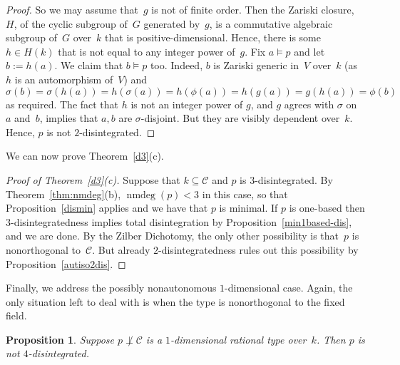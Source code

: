 \documentclass[\DocOpts]{amsart}
\newtheorem{proposition}[theorem]{Proposition}
\theoremstyle{definition}
\def\nmdeg{\operatorname{nmdeg}}
\def\C{\mathcal{C}}
\newcommand{\<}{\langle}
\renewcommand{\>}{\rangle}
\begin{document}
\begin{proof}
So we may assume that~$g$ is not of finite order.
Then the Zariski closure, $H$, of the cyclic subgroup of~$G$ generated by~$g$, is a commutative algebraic subgroup of~$G$ over~$k$ that is positive-dimensional.
Hence, there is some $h\in H(k)$ that is not equal to any integer power of~$g$.
Fix $a\models p$ and let $b:=h(a)$.
We claim that $b\models p$ too.
Indeed, $b$ is Zariski generic in~$V$ over~$k$ (as $h$ is an automorphism of~$V$) and
$$\sigma(b)=\sigma(h(a))=h(\sigma(a))=h(\phi(a))=h(g(a))=g(h(a))=\phi(b)
$$
as required.
The fact that $h$ is not an integer power of $g$, and $g$ agrees with $\sigma$ on~$a$ and~$b$, implies that $a, b$ are $\sigma$-disjoint.
But they are visibly dependent over~$k$.
Hence, $p$ is not $2$-disintegrated.
\end{proof}

We can now prove Theorem~\ref{d3}(c).

\begin{proof}[Proof of Theorem~\ref{d3}(c)]
Suppose that $k\subseteq\C$ and $p$ is $3$-disintegrated.
By Theorem~\ref{thm:nmdeg}(b), $\nmdeg(p)< 3$ in this case, so that Proposition~\ref{dismin} applies and we have that $p$ is minimal.
If $p$ is one-based then $3$-disintegratedness implies total disintegration by Proposition~\ref{min1based-dis}, and we are done.
By the Zilber Dichotomy, the only other possibility is that~$p$ is nonorthogonal to~$\C$.
But already $2$-disintegratedness rules out this possibility by Proposition~\ref{autiso2dis}.
\end{proof}

Finally, we address the possibly nonautonomous $1$-dimensional case.
Again, the only situation left to deal with is when the type is nonorthogonal to the fixed field.

\begin{proposition}
\label{nonautiso4dis}
Suppose $p\not\perp\C$ is a $1$-dimensional rational type over~$k$.
Then $p$ is not $4$-disintegrated.
\end{proposition}
\end{document}
